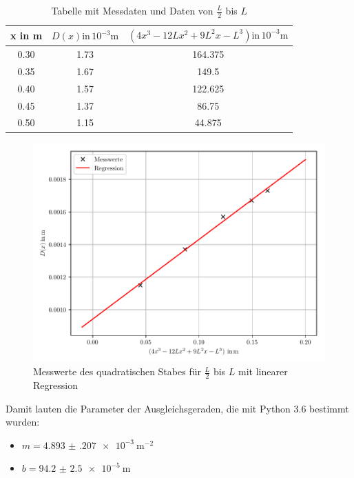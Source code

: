 \begin{table}
  \centering
  \caption{Tabelle mit Messdaten und Daten von $\frac{L}{2}$ bis $L$}
  \begin{tabular}{c c c}
    \toprule
    x in \si{\meter} & $D(x) \text{in} \, 10^{-3} \si{\meter}$ &
    $ \left( 4x^3-12Lx^2+9L^2x-L^3 \right) \text{in} \, 10^{-3} \si{\meter}$\\
    \midrule
    0.30 & 1.73 & 164.375 \\
    0.35 & 1.67 & 149.5 \\
    0.40 & 1.57 & 122.625 \\
    0.45 & 1.37 & 86.75 \\
    0.50 & 1.15 & 44.875 \\
    \bottomrule
  \end{tabular}
\end{table}

\begin{figure}[H]
  \centering
  \includegraphics[width=\textwidth]{ausgleichsgerade3.1.pdf}
  \caption{Messwerte des quadratischen Stabes für $\frac{L}{2}$ bis $L$ mit linearer Regression}
\end{figure}

Damit lauten die Parameter der Ausgleichsgeraden, die mit Python 3.6 bestimmt wurden:

\begin{itemize}
  \item $m = \SI{4.893(207)e-3}{\meter\tothe{-2}}$
  \item $b = \SI{94.2(25)e-5}{\meter}$
\end{itemize}


